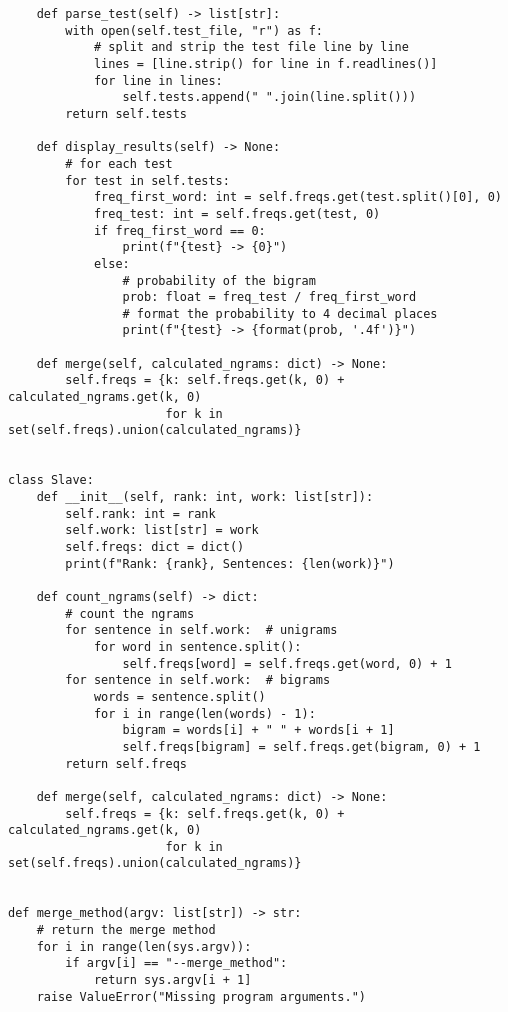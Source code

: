 \documentclass[12pt, A4, titlepage]{article}
\begin{document}
\begin{verbatim}
    def parse_test(self) -> list[str]:
        with open(self.test_file, "r") as f:
            # split and strip the test file line by line
            lines = [line.strip() for line in f.readlines()]
            for line in lines:
                self.tests.append(" ".join(line.split()))
        return self.tests

    def display_results(self) -> None:
        # for each test
        for test in self.tests:
            freq_first_word: int = self.freqs.get(test.split()[0], 0)
            freq_test: int = self.freqs.get(test, 0)
            if freq_first_word == 0:
                print(f"{test} -> {0}")
            else:
                # probability of the bigram
                prob: float = freq_test / freq_first_word
                # format the probability to 4 decimal places
                print(f"{test} -> {format(prob, '.4f')}")

    def merge(self, calculated_ngrams: dict) -> None:
        self.freqs = {k: self.freqs.get(k, 0) + calculated_ngrams.get(k, 0)
                      for k in set(self.freqs).union(calculated_ngrams)}


class Slave:
    def __init__(self, rank: int, work: list[str]):
        self.rank: int = rank
        self.work: list[str] = work
        self.freqs: dict = dict()
        print(f"Rank: {rank}, Sentences: {len(work)}")

    def count_ngrams(self) -> dict:
        # count the ngrams
        for sentence in self.work:  # unigrams
            for word in sentence.split():
                self.freqs[word] = self.freqs.get(word, 0) + 1
        for sentence in self.work:  # bigrams
            words = sentence.split()
            for i in range(len(words) - 1):
                bigram = words[i] + " " + words[i + 1]
                self.freqs[bigram] = self.freqs.get(bigram, 0) + 1
        return self.freqs

    def merge(self, calculated_ngrams: dict) -> None:
        self.freqs = {k: self.freqs.get(k, 0) + calculated_ngrams.get(k, 0)
                      for k in set(self.freqs).union(calculated_ngrams)}


def merge_method(argv: list[str]) -> str:
    # return the merge method
    for i in range(len(sys.argv)):
        if argv[i] == "--merge_method":
            return sys.argv[i + 1]
    raise ValueError("Missing program arguments.")
\end{verbatim}
\end{document}
